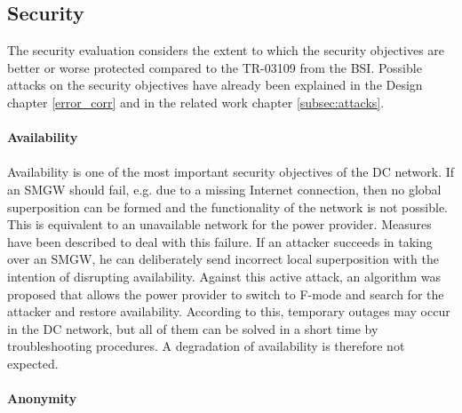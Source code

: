\subsection{Security}
The security evaluation considers the extent to which the security objectives are better or worse protected compared to the \gls{TR-03109} from the \gls{BSI}. Possible attacks on the security objectives have already been explained in the Design chapter \ref{error_corr} and in the related work chapter \ref{subsec:attacks}.
\\
\\
\textbf{Availability}
\\
\\
Availability is one of the most important security objectives of the DC network. If an \gls{SMGW} should fail, e.g. due to a missing Internet connection, then no global superposition can be formed and the functionality of the network is not possible. This is equivalent to an unavailable network for the power provider. Measures have been described to deal with this failure. If an attacker succeeds in taking over an \gls{SMGW}, he can deliberately send incorrect local superposition with the intention of disrupting availability. Against this active attack, an algorithm was proposed that allows the power provider to switch to F-mode and search for the attacker and restore availability. According to this, temporary outages may occur in the DC network, but all of them can be solved in a short time by troubleshooting procedures. A degradation of availability is therefore not expected.
\\
\\
\textbf{Anonymity}
\\
\\
